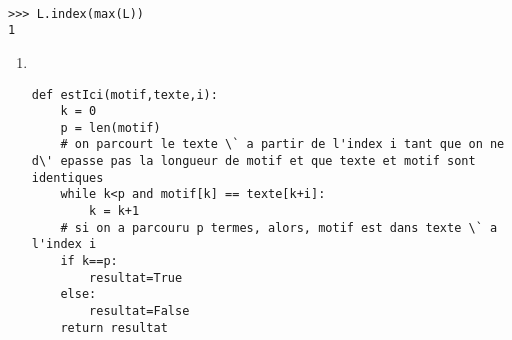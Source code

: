 \begin{solution}~\\
\vspace{-0.7cm}
\begin{verbatim}
>>> L.index(max(L))
1
\end{verbatim}
\end{solution}




\begin{solution}
\begin{enumerate}
\item ~\\
\vspace{-0.7cm}
\begin{verbatim}
def estIci(motif,texte,i):
    k = 0
    p = len(motif)
    # on parcourt le texte \` a partir de l'index i tant que on ne d\' epasse pas la longueur de motif et que texte et motif sont identiques
    while k<p and motif[k] == texte[k+i]:
        k = k+1
    # si on a parcouru p termes, alors, motif est dans texte \` a l'index i
    if k==p:
        resultat=True
    else:
        resultat=False    	
    return resultat                
\end{verbatim}


\end{enumerate}
\end{solution}
